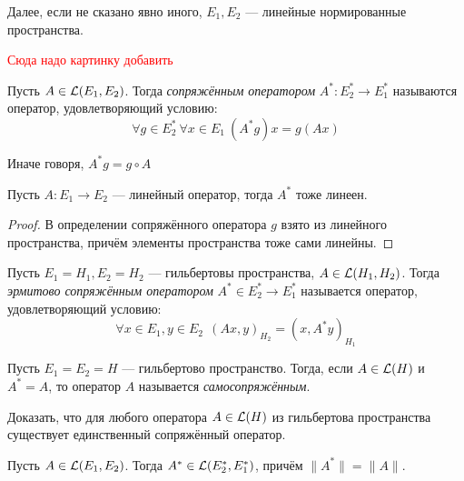 \begin{note}
	Далее, если не сказано явно иного, $E_1, E_2$ --- линейные нормированные пространства.
\end{note}

\textcolor{red}{Сюда надо картинку добавить}

\begin{definition}
	Пусть $A \in \mathcal{L}(E_1, E_2)$. Тогда \textit{сопряжённым оператором} $A^* \colon E_2^* \to E_1^*$ называются оператор, удовлетворяющий условию:
	\[
		\forall g \in E_2^*\ \forall x \in E_1\ (A^*g)x = g(Ax)
	\]
\end{definition}

\begin{anote}
	Иначе говоря, $A^*g = g \circ A$
\end{anote}

\begin{proposition}
	Пусть $A \colon E_1 \to E_2$ --- линейный оператор, тогда $A^*$ тоже линеен.
\end{proposition}

\begin{proof}
	В определении сопряжённого оператора $g$ взято из линейного пространства, причём элементы пространства тоже сами линейны.
\end{proof}

\begin{definition}
	Пусть $E_1 = H_1, E_2 = H_2$ --- гильбертовы пространства, $A \in \mathcal{L}(H_1, H_2)$. Тогда \textit{эрмитово сопряжённым оператором} $A^* \in E_2^* \to E_1^*$ называется оператор, удовлетворяющий условию:
	\[
		\forall x \in E_1, y \in E_2\ \ (Ax, y)_{H_2} = (x, A^*y)_{H_1}
	\]
\end{definition}

\begin{definition}
	Пусть $E_1 = E_2 = H$ --- гильбертово пространство. Тогда, если $A \in \mathcal{L}(H)$ и $A^* = A$, то оператор $A$ называется \textit{самосопряжённым}.
\end{definition}

\begin{exercise}
	Доказать, что для любого оператора $A \in \mathcal{L}(H)$ из гильбертова пространства существует единственный сопряжённый оператор.
\end{exercise}

\begin{theorem}
	Пусть $A \in \mathcal{L}(E_1, E_2)$. Тогда $A^* \in \mathcal{L}(E_2^*, E_1^*)$, причём $\|A^*\| = \|A\|$.
\end{theorem}

